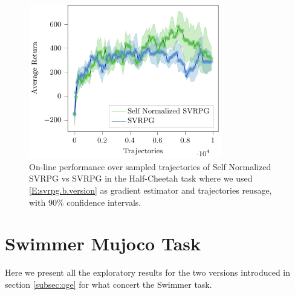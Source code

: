 \begin{figure}[h]
	\begin{minipage}[h]{1\textwidth}
		\centering
		\includegraphics[width=0.75\textwidth]{Images/Experiments/half_cheetah_SVRPG_vs_SN_SVRPG_B_reuse.pdf}
		\vspace{-0.1in}
		\caption{On-line performance over sampled trajectories of Self Normalized \acs{SVRPG} vs \acs{SVRPG} in the Half-Cheetah task where we used \ref{E:svrpg.b.version} as gradient estimator and trajectories reusage, with 90\% confidence intervals.}
		\label{fig:hceleven}
	\end{minipage}
	\vspace{-0.15in}
\end{figure}

\clearpage
\section{Swimmer Mujoco Task}
\vspace{-0.05in}
Here we present all the exploratory results for the two versions introduced in section \ref{subsec:oge} for what concert the Swimmer task.

